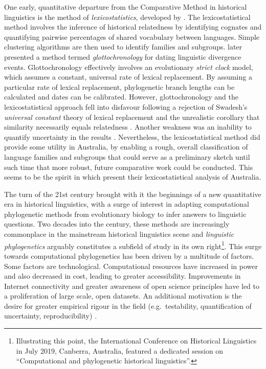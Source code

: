 One early, quantitative departure from the Comparative Method in historical linguistics is the method of \emph{lexicostatistics}, developed by \textcite{swadesh_lexico-statistic_1952}. The lexicostatistical method involves the inference of historical relatedness by identifying cognates and quantifying pairwise percentages of shared vocabulary between languages. Simple clustering algorithms are then used to identify families and subgroups. \textcite{swadesh_towards_1955} later presented a method termed \emph{glottochronology} for dating linguistic divergence events. Glottochronology effectively involves an evolutionary \emph{strict clock} model, which assumes a constant, universal rate of lexical replacement. By assuming a particular rate of lexical replacement, phylogenetic branch lengths can be calculated and dates can be calibrated. However, glottochronology and the lexicostatistical approach fell into disfavour following a rejection of Swadesh's \emph{universal constant} theory of lexical replacement \autocite{blust_why_2000} and the unrealistic corollary that similarity necessarily equals relatedness \autocite{bowern_computational_2018}. Another weakness was an inability to quantify uncertainty in the results \autocite{atkinson_curious_2005}. Nevertheless, the lexicostatistical method did provide some utility in Australia, by enabling a rough, overall classification of language families and subgroups that could serve as a preliminary sketch until such time that more robust, future comparative work could be conducted. This seems to be the spirit in which \textcite{ogrady_languages_1966} present their lexicostatistical analysis of Australia.

The turn of the 21st century brought with it the beginnings of a new quantitative era in historical linguistics, with a surge of interest in adapting computational phylogenetic methods from evolutionary biology to infer answers to linguistic questions. Two decades into the century, these methods are increasingly commonplace in the mainstream historical linguistics scene and \emph{linguistic phylogenetics} arguably constitutes a subfield of study in its own right\footnote{Illustrating this point, the International Conference on Historical Linguistics in July 2019, Canberra, Australia, featured a dedicated session on ``Computational and phylogenetic historical linguistics''.}. This surge towards computational phylogenetics has been driven by a multitude of factors. Some factors are technological. Computational resources have increased in power and also decreased in cost, leading to greater accessibility. Improvements in Internet connectivity and greater awareness of open science principles have led to a proliferation of large scale, open datasets. An additional motivation is the desire for greater empirical rigour in the field (e.g.~testability, quantification of uncertainty, reproducibility) \autocites{atkinson_curious_2005}{mcmahon_finding_2003}{nunn_comparative_2011}.


